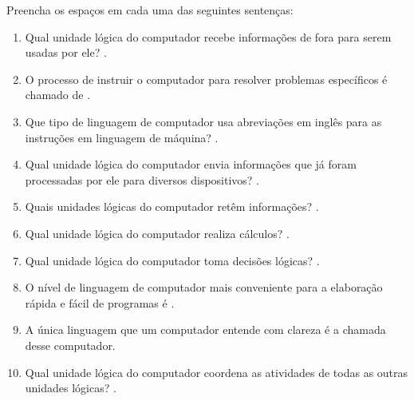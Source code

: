 \documentclass[12pt,a4paper]{article}
\begin{document}
\begin{enunciadoBox}[Enunciado]
Preencha os espaços em cada uma das seguintes sentenças:
\begin{enumerate}
  \item Qual unidade lógica do computador recebe informações de fora para serem usadas por ele? \underline{\hspace{4cm}}.
  \item O processo de instruir o computador para resolver problemas específicos é chamado de \underline{\hspace{4cm}}.
  \item Que tipo de linguagem de computador usa abreviações em inglês para as instruções em linguagem de máquina? \underline{\hspace{4cm}}.
  \item Qual unidade lógica do computador envia informações que já foram processadas por ele para diversos dispositivos? \underline{\hspace{4cm}}.
  \item Quais unidades lógicas do computador retêm informações? \underline{\hspace{4cm}}.
  \item Qual unidade lógica do computador realiza cálculos? \underline{\hspace{4cm}}.
  \item Qual unidade lógica do computador toma decisões lógicas? \underline{\hspace{4cm}}.
  \item O nível de linguagem de computador mais conveniente para a elaboração rápida e fácil de programas é \underline{\hspace{4cm}}.
  \item A única linguagem que um computador entende com clareza é a chamada \underline{\hspace{4cm}} desse computador.
  \item Qual unidade lógica do computador coordena as atividades de todas as outras unidades lógicas? \underline{\hspace{4cm}}.
\end{enumerate}
\end{enunciadoBox}

\bigskip
\end{document}
